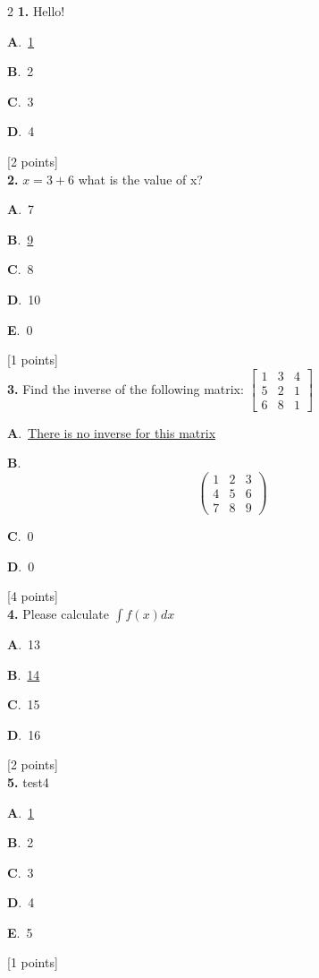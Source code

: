 \documentclass[12pt]{article}
\newcommand{\choice}[3]{%
  \noindent\textbf{#1}.~#2\hfill#3\par\vspace{0.25em}
}
\begin{document}
\begin{multicols}{2}
\noindent \textbf{\textenglish{1.}} {\textenglish{Hello!}}

\noindent\choice{A}{\underline{{\textenglish{1}}}}{}
\noindent\choice{B}{{\textenglish{2}}}{}
\noindent\choice{C}{{\textenglish{3}}}{}
\noindent\choice{D}{{\textenglish{4}}}{}
\hfill {\textenglish{[2 points]}}\\[0.5em]

\noindent \textbf{\textenglish{2.}} \(x=3+6 \){\textenglish{ what is the value of x?}}

\noindent\choice{A}{{\textenglish{7}}}{}
\noindent\choice{B}{\underline{{\textenglish{9}}}}{}
\noindent\choice{C}{{\textenglish{8}}}{}
\noindent\choice{D}{{\textenglish{10}}}{}
\noindent\choice{E}{{\textenglish{0}}}{}
\hfill {\textenglish{[1 points]}}\\[0.5em]

\noindent \textbf{\textenglish{3.}} {\textenglish{Find the inverse of the following matrix: }}\(\begin{bmatrix} 1 & 3 & 4 \\ 5 & 2 & 1 \\ 6 & 8 & 1 \end{bmatrix}\)

\noindent\choice{A}{\underline{{\textenglish{There is no inverse for this matrix}}}}{}
\noindent\choice{B}{\[\begin{pmatrix} 1 & 2 & 3 \\ 4 & 5 & 6 \\ 7 & 8 & 9  \end{pmatrix}\]}{}
\noindent\choice{C}{{\textenglish{0}}}{}
\noindent\choice{D}{{\textenglish{0}}}{}
\hfill {\textenglish{[4 points]}}\\[0.5em]

\noindent \textbf{\textenglish{4.}} {\textenglish{Please calculate }}\(\int f(x)dx\)

\noindent\choice{A}{{\textenglish{13}}}{}
\noindent\choice{B}{\underline{{\textenglish{14}}}}{}
\noindent\choice{C}{{\textenglish{15}}}{}
\noindent\choice{D}{{\textenglish{16}}}{}
\hfill {\textenglish{[2 points]}}\\[0.5em]

\noindent \textbf{\textenglish{5.}} {\textenglish{test4}}

\noindent\choice{A}{\underline{{\textenglish{1}}}}{}
\noindent\choice{B}{{\textenglish{2}}}{}
\noindent\choice{C}{{\textenglish{3}}}{}
\noindent\choice{D}{{\textenglish{4}}}{}
\noindent\choice{E}{{\textenglish{5}}}{}
\hfill {\textenglish{[1 points]}}\\[0.5em]


\end{multicols}
\end{document}
